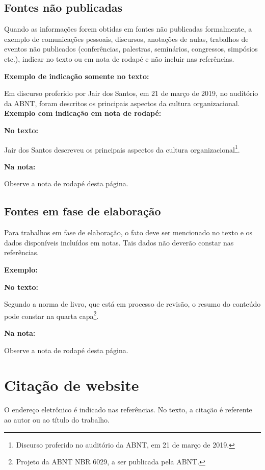 \subsection{Fontes não publicadas}

Quando as informações forem obtidas em fontes não publicadas formalmente, a exemplo de comunicações pessoais, discursos, anotações de aulas, trabalhos de eventos não publicados (conferências, palestras, seminários, congressos, simpósios etc.), indicar no texto ou em nota de rodapé e não incluir nas referências.

\textbf{Exemplo de indicação somente no texto:}

Em discurso proferido por Jair dos Santos, em 21 de março de 2019, no auditório da ABNT, foram descritos os principais aspectos da cultura organizacional.\\

\textbf{Exemplo com indicação em nota de rodapé:}

\textbf{No texto:}

Jair dos Santos descreveu os principais aspectos da cultura organizacional\footnote{Discurso proferido no auditório da ABNT, em 21 de março de 2019.}.

\textbf{Na nota:}

Observe a nota de rodapé desta página.


\subsection{Fontes em fase de elaboração}

Para trabalhos em fase de elaboração, o fato deve ser mencionado no texto e os dados disponíveis incluídos em notas. Tais dados não deverão constar nas referências.

\textbf{Exemplo:}

\textbf{No texto:}

Segundo a norma de livro, que está em processo de revisão, o resumo do conteúdo pode constar na quarta capa\footnote{Projeto da ABNT NBR 6029, a ser publicada pela ABNT.}.

\textbf{Na nota:}

Observe a nota de rodapé desta página.


\section{Citação de website}

O endereço eletrônico é indicado nas referências. No texto, a citação é referente ao autor ou ao título do trabalho. 

